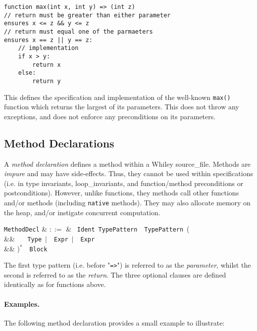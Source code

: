 \begin{lstlisting}
function max(int x, int y) => (int z)
// return must be greater than either parameter
ensures x <= z && y <= z
// return must equal one of the parmaeters
ensures x == z || y == z:
    // implementation
    if x > y:
        return x
    else:
        return y
\end{lstlisting}

This defines the specification and implementation of the well-known
\lstinline{max()} function which returns the largest of its
parameters. This does not throw any exceptions, and does not enforce
any preconditions on its parameters.


\subsection{Method Declarations}

A {\em method declaration} defines a method within a Whiley
\gls{source_file}.  Methods are {\em impure} and may have
side-effects.  Thus, they cannot be used within specifications
(i.e. in type invariants, \gls{loop_invariant}s, and function/method
\gls{precondition}s or \gls{postcondition}s).  However, unlike
functions, they methods call other functions and/or methods (including
\lstinline{native} methods).  They may also allocate memory on the
heap, and/or instigate concurrent computation.

\begin{syntax}
  \verb+MethodDecl+ & $::=$ & \ \verb+Ident+\
  \verb+TypePattern+\ \token{=>}\ \verb+TypePattern+\ \big(\\
  && \ \ \ \verb+Type+\ $|$\ \
  \verb+Expr+\ $|$\ \ \verb+Expr+\\
  && \big)$^*$\ \token{:}\ \verb+Block+\\
\end{syntax}

The first type pattern (i.e. before "\lstinline{=>}") is referred to
as the {\em parameter}, whilst the second is referred to as the {\em
  return}.  The three optional clauses are defined identically as for
functions above.

\paragraph{Examples.}  The following method declaration provides a
small example to illustrate:

